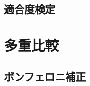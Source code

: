 \subsection{適合度検定}

\section{多重比較}
\label{sec:stat-multiple-comparison}



\subsection{ボンフェロニ補正}

\begin{chaptersummary}
\end{chaptersummary}
